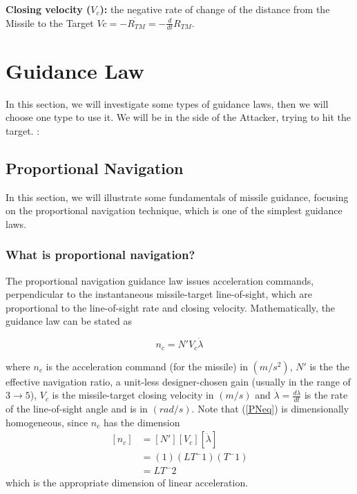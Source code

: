 \textbf{Closing velocity ($V_c$):} the negative rate of change of the distance
from the Missile to the Target $Vc= -\dot{R_{TM}}=-\frac{d}{dt} R_{TM} $.


\section{Guidance Law}


In this section, we will investigate some types of guidance laws, then we will choose one type to use it. We will be in the side of the Attacker, trying to hit the target.  :

\subsection{Proportional Navigation}
In this section, we will illustrate some fundamentals of missile guidance, focusing on the proportional navigation technique, which is one of the simplest guidance laws.

\subsubsection*{What is proportional navigation?}
The proportional navigation guidance law issues acceleration commands,
perpendicular to the instantaneous missile-target line-of-sight, which are
proportional to the line-of-sight rate and closing velocity. Mathematically, the
guidance law can be stated as

\begin{equation}
n_c= N' V_c \dot{\lambda}
\label{PNeq}
\end{equation}

where $n_c$ is the acceleration command (for the missile) in $(m/s^2)$, $N'$ is the the effective navigation ratio, a unit-less designer-chosen gain (usually in the range of $3 \to 5$), $V_c$ is the missile-target closing velocity in $(m/s)$ and $\dot{\lambda} = \frac{d\lambda}{dt}$ is the rate of the line-of-sight angle and is in $(rad/s)$. Note that (\ref{PNeq}) is dimensionally homogeneous, since $n_c$ has the dimension
\begin{equation}
\begin{split}
[n_c] &= [N'] [V_c] [\dot{\lambda}]\\
&=(1) (LT^-1) (T^-1)\\
&=LT^-2
\end{split}
\label{PN dimensionallity}
\end{equation}
which is the appropriate dimension of linear acceleration.

